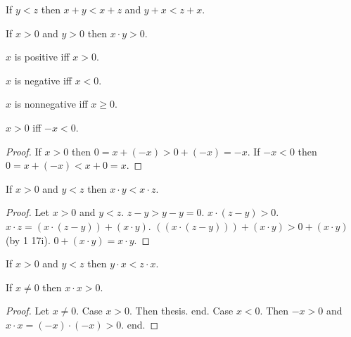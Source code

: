 \documentclass{article}
\begin{document}
\begin{forthel}

\begin{axiom}[1 17 i]
If $y < z$ then $x + y < x + z$ and $y + x < z + x$.
\end{axiom}

\begin{axiom}[1 17 ii]
If $x > 0$ and $y > 0$ then $x \cdot y > 0$.
\end{axiom}

\begin{definition}
$x$ is positive iff $x > 0$.
\end{definition}

\begin{definition}
$x$ is negative iff $x < 0$.
\end{definition}

\begin{definition}
$x$ is nonnegative iff $x \geq 0$.
\end{definition}


\begin{proposition}[1 18 a]
$x > 0$ iff $-x < 0$.
\end{proposition}
\begin{proof}
If $x > 0$ then $0 = x + (-x) > 0 + (-x) = -x$.
If $-x < 0$ then $0 = x + (-x) < x + 0 = x$.
\end{proof}

\begin{proposition}[1 18 b]
If $x > 0$ and $y < z$ then
$x \cdot y < x \cdot z$.
\end{proposition}
\begin{proof}
Let $x > 0$ and $y < z$.
$z - y > y - y = 0$.
$x \cdot (z - y) > 0$.
$x \cdot z = (x \cdot (z - y)) + (x \cdot y)$.
$((x \cdot (z - y))) + (x \cdot y)  > 0 + (x \cdot y)$ (by 1 17i).
$0 + (x \cdot y) = x \cdot y$.
\end{proof}

\begin{proposition}[1 18 bb]
If $x > 0$ and $y < z$ then
$y \cdot x < z \cdot x$.
\end{proposition}


\begin{proposition}[1 18 d]
If $x \neq 0$ then $x \cdot x > 0$.
\end{proposition}
\begin{proof}
Let $x \neq 0$.
Case $x > 0$. Then thesis. end.
Case $x < 0$. Then $ -x > 0$ and $x \cdot x = (-x) \cdot (-x) > 0$. end.
\end{proof}


\end{forthel}
\end{document}
